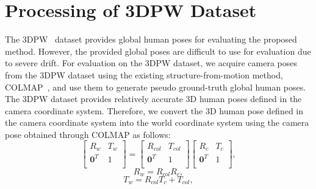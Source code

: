 \documentclass[10pt,twocolumn,letterpaper]{article}
\begin{document}
\section{Processing of 3DPW Dataset}
\label{sec:processing_of_3DPW_dataset}

The 3DPW~\cite{von2018recovering} dataset provides global human poses for evaluating the proposed method. However, the provided global poses are difficult to use for evaluation due to severe drift. For evaluation on the 3DPW dataset, we acquire camera poses from the 3DPW dataset using the existing structure-from-motion method, COLMAP~\cite{schonberger2016structure}, and use them to generate pseudo ground-truth global human poses. The 3DPW dataset provides relatively accurate 3D human poses defined in the camera coordinate system. Therefore, we convert the 3D human pose defined in the camera coordinate system into the world coordinate system using the camera pose obtained through COLMAP as follows:
\begin{equation}
\label{eq: global pose calculation using camera pose of colmap}
    \begin{bmatrix}
    R_{w} & T_{w} \\
    \mathbf{0}^{T} & 1 \\
    \end{bmatrix}
    =
    \begin{bmatrix}
    R_{col} & T_{col} \\
    \mathbf{0}^{T} & 1 \\
    \end{bmatrix}
    \begin{bmatrix}
    R_{c} & T_{c} \\
    \mathbf{0}^{T} & 1 \\
    \end{bmatrix}
    ,
\end{equation}
\begin{equation}
\label{eq: orientation calculation using camera pose of colmap}
    R_{w}=R_{col}R_{c},
\end{equation}
\begin{equation}
\label{eq: translation calculation using camera pose of colmap}
    T_{w}=R_{col}T_{c}+T_{col},
\end{equation}
\end{document}
